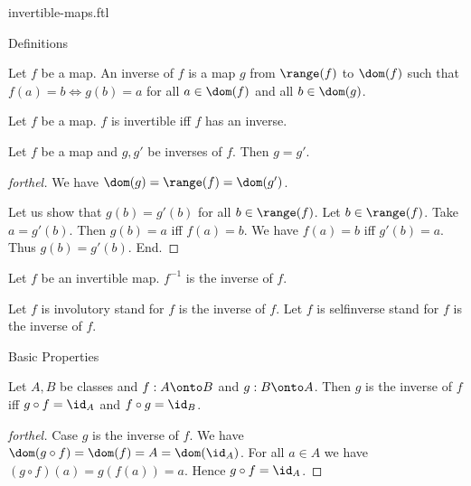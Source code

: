 \documentclass{naproche-library}
\begin{document}
\begin{smodule}[title=Invertible Maps]{invertible-maps.ftl}

\begin{sfragment}{Definitions}
  \begin{definition}[forthel,id=FOUNDATIONS_09_7776974319648768]
    Let $f$ be a map.
    An inverse of $f$ is a map $g$ from $\range(f)$ to $\dom(f)$ such that $f(a) = b \iff g(b) = a$ for all $a \in \dom(f)$ and all $b \in \dom(g)$.
  \end{definition}

  \begin{definition}[forthel,id=FOUNDATIONS_09_3430350086733824]
    Let $f$ be a map.
    $f$ is invertible iff $f$ has an inverse.
  \end{definition}

  \begin{lemma}[forthel,id=FOUNDATIONS_09_5108611793551360]
    Let $f$ be a map and $g, g'$ be inverses of $f$.
    Then $g = g'$.
  \end{lemma}
  \begin{proof}[forthel]
    We have $\dom(g) = \range(f) = \dom(g')$.

    Let us show that $g(b) = g'(b)$ for all $b \in \range(f)$.
      Let $b \in \range(f)$.
      Take $a = g'(b)$.
      Then $g(b) = a$ iff $f(a) = b$.
      We have $f(a) = b$ iff $g'(b) = a$.
      Thus $g(b) = g'(b)$.
    End.
  \end{proof}

  \begin{definition}[forthel,id=FOUNDATIONS_09_6458627204317184]
    Let $f$ be an invertible map.
    $f^{-1}$ is the inverse of $f$.

    Let $f$ is involutory stand for $f$ is the inverse of $f$.
    Let $f$ is selfinverse stand for $f$ is the inverse of $f$.
  \end{definition}
\end{sfragment}

\begin{sfragment}{Basic Properties}
  \begin{proposition}[forthel,id=FOUNDATIONS_09_7840743571849216]
    Let $A, B$ be classes and $f : A \onto B$ and $g : B \onto A$.
    Then $g$ is the inverse of $f$ iff $g \circ f = \id_{A}$ and $f \circ g = \id_{B}$.
  \end{proposition}
  \begin{proof}[forthel]
    Case $g$ is the inverse of $f$.
      We have
      $\dom(g \circ f)
        = \dom(f)
        = A
        = \dom(\id_{A})$.
      For all $a \in A$ we have
      $(g \circ f)(a)
        = g(f(a))
        = a$.
      Hence $g \circ f = \id_{A}$.


\end{proof}
\end{sfragment}
\end{smodule}
\end{document}

